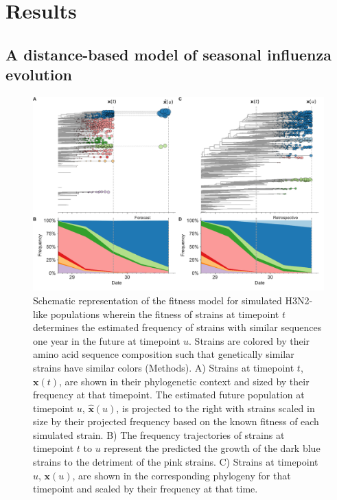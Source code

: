 \documentclass[9pt,lineno]{elife} %
\providecommand{\DIFaddbeginFL}{} %
\providecommand{\DIFaddendFL}{} %
\providecommand{\DIFdelbeginFL}{} %
\providecommand{\DIFdelendFL}{} %
\providecommand{\DIFaddbeginFL}{} %
\providecommand{\DIFaddendFL}{} %
\providecommand{\DIFdelbeginFL}{} %
\providecommand{\DIFdelendFL}{} %
\newcommand{\DIFscaledelfig}{0.5}
\newlength{\DIFdelgraphicswidth} %
\newlength{\DIFdelgraphicsheight} %
\newcommand{\DIFaddincludegraphics}[2][]{{\color{blue}\fbox{\DIFOincludegraphics[#1]{#2}}}} %
\newcommand{\DIFdelincludegraphics}[2][]{%
\sbox{\DIFdelgraphicsbox}{\DIFOincludegraphics[#1]{#2}}%
\settoboxwidth{\DIFdelgraphicswidth}{\DIFdelgraphicsbox} %
\settoboxtotalheight{\DIFdelgraphicsheight}{\DIFdelgraphicsbox} %
\scalebox{\DIFscaledelfig}{%
\parbox[b]{\DIFdelgraphicswidth}{\usebox{\DIFdelgraphicsbox}\\[-\baselineskip] \rule{\DIFdelgraphicswidth}{0em}}\llap{\resizebox{\DIFdelgraphicswidth}{\DIFdelgraphicsheight}{%
\setlength{\unitlength}{\DIFdelgraphicswidth}%
\begin{picture}(1,1)%
\thicklines\linethickness{2pt} %
{\color[rgb]{1,0,0}\put(0,0){\framebox(1,1){}}}%
{\color[rgb]{1,0,0}\put(0,0){\line( 1,1){1}}}%
{\color[rgb]{1,0,0}\put(0,1){\line(1,-1){1}}}%
\end{picture}%
}\hspace*{3pt}}} %
} %
\DeclareRobustCommand{\DIFaddbeginFL}{\DIFOaddbeginFL \let\includegraphics\DIFaddincludegraphics} %
\DeclareRobustCommand{\DIFaddendFL}{\DIFOaddendFL \let\includegraphics\DIFOincludegraphics} %
\DeclareRobustCommand{\DIFdelbeginFL}{\DIFOdelbeginFL \let\includegraphics\DIFdelincludegraphics} %
\DeclareRobustCommand{\DIFdelendFL}{\DIFOaddendFL \let\includegraphics\DIFOincludegraphics} %
\begin{document}
\section*{Results}

\subsection*{A distance-based model of seasonal influenza evolution}

\begin{figure}[htb]
  \begin{center}
  \DIFdelbeginFL %
\DIFdelendFL \DIFaddbeginFL \includegraphics[width=\columnwidth]{Figure_1.pdf}
  \DIFaddendFL \caption{
    Schematic representation of the fitness model for simulated H3N2-like populations wherein the fitness of strains at timepoint $t$ determines the estimated frequency of strains with similar sequences one year in the future at timepoint $u$.
    Strains are colored by their amino acid sequence composition such that genetically similar strains have similar colors (Methods).
    A) Strains at timepoint $t$, $\mathbf{x}(t)$, are shown in their phylogenetic context and sized by their frequency at that timepoint.
    The estimated future population at timepoint $u$, $\mathbf{\hat{x}}(u)$, is projected to the right with strains scaled in size by their projected frequency based on the known fitness of each simulated strain.
    B) The frequency trajectories of strains at timepoint $t$ to $u$ represent the predicted the growth of the dark blue strains to the detriment of the pink strains.
    C) Strains at timepoint $u$, $\mathbf{x}(u)$, are shown in the corresponding phylogeny for that timepoint and scaled by their frequency at that time.
}
\end{center}
\end{figure}
\end{document}
